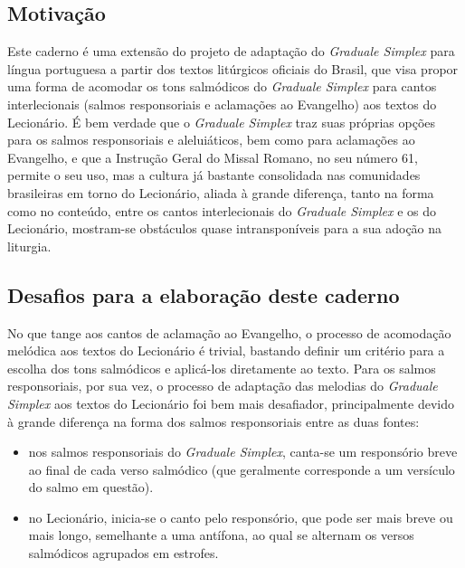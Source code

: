 \newcommand{\GR}{\emph{Graduale Romanum}}
\newcommand{\GS}{\emph{Graduale Simplex}}
\newcommand{\KS}{\emph{Kyriale Simplex}}
\newcommand{\Al}{\emph{Allelúia}}
\newcommand{\Schola}{\emph{schola}}
\newcommand{\ScholaC}{\emph{schola cantorum}}
\newcommand{\FirstPara}[1]{\noindent\textcolor{gregoriocolor}{#1.}}
\newcommand{\Para}[1]{\vspace{\baselineskip}\noindent\textcolor{gregoriocolor}{#1.}}



\subsection{Motivação}

Este caderno é uma extensão do projeto de adaptação do {\GS} para língua portuguesa a partir dos textos litúrgicos oficiais do Brasil, que visa propor uma forma de acomodar os tons salmódicos do {\GS} para cantos interlecionais (salmos responsoriais e aclamações ao Evangelho) aos textos do Lecionário. É bem verdade que o {\GS} traz suas próprias opções para os salmos responsoriais e aleluiáticos, bem como para aclamações ao Evangelho, e que a Instrução Geral do Missal Romano, no seu número 61, permite o seu uso, mas a cultura já bastante consolidada nas comunidades brasileiras em torno do Lecionário, aliada à grande diferença, tanto na forma como no conteúdo, entre os cantos interlecionais do {\GS} e os do Lecionário, mostram-se obstáculos quase intransponíveis para a sua adoção na liturgia.

\subsection{Desafios para a elaboração deste caderno}

No que tange aos cantos de aclamação ao Evangelho, o processo de acomodação melódica aos textos do Lecionário é trivial, bastando definir um critério para a escolha dos tons salmódicos e aplicá-los diretamente ao texto. Para os salmos responsoriais, por sua vez, o processo de adaptação das melodias do {\GS} aos textos do Lecionário foi bem mais desafiador, principalmente devido à grande diferença na forma dos salmos responsoriais entre as duas fontes:
\begin{itemize}
  \item nos salmos responsoriais do {\GS}, canta-se um responsório breve ao final de cada verso salmódico (que geralmente corresponde a um versículo do salmo em questão).
  \item no Lecionário, inicia-se o canto pelo responsório, que pode ser mais breve ou mais longo, semelhante a uma antífona, ao qual se alternam os versos salmódicos agrupados em estrofes.
\end{itemize}

